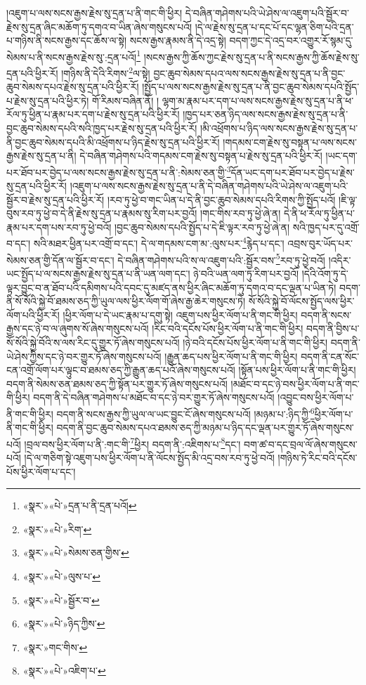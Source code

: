 །འཇུག་པ་ལས་སངས་རྒྱས་རྗེས་སུ་དྲན་པ་ནི་གང་གི་ཕྱིར། དེ་བཞིན་གཤེགས་པའི་ཡེ་ཤེས་ལ་འཇུག་པའི་སྦྱོར་བ་རྗེས་སུ་དྲན་ཞིང་མཆོག་ཏུ་དགའ་བ་ཡིན་ཞེས་གསུངས་པའོ། །དེ་ལ་རྗེས་སུ་དྲན་པ་དང་པོ་དང་ལྷན་ཅིག་པའི་དྲན་པ་གཉིས་ནི་སངས་རྒྱས་དང་ཆོས་ལ་སྟེ། སངས་རྒྱས་རྣམས་ནི་དེ་འདྲ་སྟེ། བདག་ཀྱང་དེ་འདྲ་བར་འགྱུར་རོ་སྙམ་དུ་སེམས་པ་ནི་སངས་རྒྱས་རྗེས་སུ་:དྲན་པའོ།\footnote{«སྣར་»«པེ་»དྲན་པ་ནི་དྲན་པའོ།} །སངས་རྒྱས་ཀྱི་ཆོས་ཀྱང་རྗེས་སུ་དྲན་པ་ནི་སངས་རྒྱས་ཀྱི་ཆོས་རྗེས་སུ་དྲན་པའི་ཕྱིར་རོ། །གཉིས་ནི་དེའི་རིགས་\footnote{«སྣར་»«པེ་»རིག་}ལ་སྟེ། བྱང་ཆུབ་སེམས་དཔའ་ལས་སངས་རྒྱས་རྗེས་སུ་དྲན་པ་ནི་བྱང་ཆུབ་སེམས་དཔའ་རྗེས་སུ་དྲན་པའི་ཕྱིར་རོ། །སྤྱོད་པ་ལས་སངས་རྒྱས་རྗེས་སུ་དྲན་པ་ནི་བྱང་ཆུབ་སེམས་དཔའི་སྤྱོད་པ་རྗེས་སུ་དྲན་པའི་ཕྱིར་ཏེ། གོ་རིམས་བཞིན་ནོ། །
ལྷག་མ་རྣམ་པར་དག་པ་ལས་སངས་རྒྱས་རྗེས་སུ་དྲན་པ་ནི་ཕ་རོལ་ཏུ་ཕྱིན་པ་རྣམ་པར་དག་པ་རྗེས་སུ་དྲན་པའི་ཕྱིར་རོ། །ཁྱད་པར་ཅན་ཉིད་ལས་སངས་རྒྱས་རྗེས་སུ་དྲན་པ་ནི་བྱང་ཆུབ་སེམས་དཔའི་སའི་ཁྱད་པར་རྗེས་སུ་དྲན་པའི་ཕྱིར་རོ། །མི་འཕྲོགས་པ་ཉིད་ལས་སངས་རྒྱས་རྗེས་སུ་དྲན་པ་ནི་བྱང་ཆུབ་སེམས་དཔའི་མི་འཕྲོགས་པ་ཉིད་རྗེས་སུ་དྲན་པའི་ཕྱིར་རོ། །གདམས་ངག་རྗེས་སུ་བསྟན་པ་ལས་སངས་རྒྱས་རྗེས་སུ་དྲན་པ་ནི། དེ་བཞིན་གཤེགས་པའི་གདམས་ངག་རྗེས་སུ་བསྟན་པ་རྗེས་སུ་དྲན་པའི་ཕྱིར་རོ། །ཡང་དག་པར་ཐོབ་པར་བྱེད་པ་ལས་སངས་རྒྱས་རྗེས་སུ་དྲན་པ་ནི་:སེམས་ཅན་གྱི་\footnote{«སྣར་»«པེ་»སེམས་ཅན་གྱིས་}དོན་ཡང་དག་པར་ཐོབ་པར་བྱེད་པ་རྗེས་སུ་དྲན་པའི་ཕྱིར་རོ། །འཇུག་པ་ལས་སངས་རྒྱས་རྗེས་སུ་དྲན་པ་ནི་དེ་བཞིན་གཤེགས་པའི་ཡེ་ཤེས་ལ་འཇུག་པའི་སྦྱོར་བ་རྗེས་སུ་དྲན་པའི་ཕྱིར་རོ། །རབ་ཏུ་ཕྱེ་བ་གང་ཡིན་པ་དེ་ནི་བྱང་ཆུབ་སེམས་དཔའི་རིགས་ཀྱི་སྤྱོད་པའོ། །ཇི་ལྟ་བུས་རབ་ཏུ་ཕྱེ་བ་དེ་ནི་རྗེས་སུ་དྲན་པ་རྣམས་སུ་རིག་པར་བྱའོ། །གང་གིས་རབ་ཏུ་ཕྱེ་ཞེ་ན། དེ་ནི་ཕ་རོལ་ཏུ་ཕྱིན་པ་རྣམ་པར་དག་པས་རབ་ཏུ་ཕྱེ་བའོ། །བྱང་ཆུབ་སེམས་དཔའི་སྤྱོད་པ་དེ་ཇི་ལྟར་རབ་ཏུ་ཕྱེ་ཞེ་ན། སའི་ཁྱད་པར་དུ་འགྲོ་བ་དང་། སའི་མཐར་ཕྱིན་པར་འགྲོ་བ་དང་། དེ་ལ་གདམས་ངག་མ་:ལུས་པར་\footnote{«སྣར་»«པེ་»ལུས་པ་}རྙེད་པ་དང་། འབྲས་བུར་ཡོད་པར་སེམས་ཅན་གྱི་དོན་ལ་སྦྱོར་བ་དང་། དེ་བཞིན་གཤེགས་པའི་ས་ལ་འཇུག་པའི་:སྦྱོར་བས་\footnote{«སྣར་»«པེ་»སྦྱོར་བ་}རབ་ཏུ་ཕྱེ་བའོ། །འདིར་ཡང་སྤྱོད་པ་ལ་སངས་རྒྱས་རྗེས་སུ་དྲན་པ་ནི་ཡན་ལག་དང་། ཉེ་བའི་ཡན་ལག་ཏུ་རིག་པར་བྱའོ། །དེའི་འོག་ཏུ་དེ་ལྟར་བྱུང་བ་ན་ཐོབ་པའི་དམིགས་པའི་དབང་དུ་མཛད་ནས་ཕྱིར་ཞིང་མཆོག་ཏུ་དགའ་བ་དང་ལྡན་པ་ཡིན་ཏེ། བདག་ནི་སོ་སོའི་སྐྱེ་བོ་ཐམས་ཅད་ཀྱི་ཡུལ་ལས་ཕྱིར་ལོག་གོ་ཞེས་རྒྱ་ཆེར་གསུངས་ཏེ། སོ་སོའི་སྐྱེ་བོ་ལོངས་སྤྱོད་ལས་ཕྱིར་ལོག་པའི་ཕྱིར་རོ། །ཕྱིར་ལོག་པ་དེ་ཡང་རྣམ་པ་དགུ་སྟེ། འཇུག་པས་ཕྱིར་ལོག་པ་ནི་གང་གི་ཕྱིར། བདག་ནི་སངས་རྒྱས་དང་ཉེ་བ་ལ་ཞུགས་སོ་ཞེས་གསུངས་པའོ། །རིང་བའི་དངོས་པོས་ཕྱིར་ལོག་པ་ནི་གང་གི་ཕྱིར། བདག་ནི་བྱིས་པ་སོ་སོའི་སྐྱེ་བོའི་ས་ལས་རིང་དུ་གྱུར་ཏོ་ཞེས་གསུངས་པའོ། །ཉེ་བའི་དངོས་པོས་ཕྱིར་ལོག་པ་ནི་གང་གི་ཕྱིར། བདག་ནི་ཡེ་ཤེས་ཀྱིས་དང་ཉེ་བར་གྱུར་ཏོ་ཞེས་གསུངས་པའོ། །རྒྱུན་ཆད་པས་ཕྱིར་ལོག་པ་ནི་གང་གི་ཕྱིར། བདག་ནི་ངན་སོང་ངན་འགྲོ་ལོག་པར་ལྟུང་བ་ཐམས་ཅད་ཀྱི་རྒྱུན་ཆད་པའོ་ཞེས་གསུངས་པའོ། །སྟོན་པས་ཕྱིར་ལོག་པ་ནི་གང་གི་ཕྱིར། བདག་ནི་སེམས་ཅན་ཐམས་ཅད་ཀྱི་སྟོན་པར་གྱུར་ཏོ་ཞེས་གསུངས་པའོ། །མཐོང་བ་དང་ཉེ་བས་ཕྱིར་ལོག་པ་ནི་གང་གི་ཕྱིར། བདག་ནི་དེ་བཞིན་གཤེགས་པ་མཐོང་བ་དང་ཉེ་བར་གྱུར་ཏོ་ཞེས་གསུངས་པའོ། །འབྱུང་བས་ཕྱིར་ལོག་པ་ནི་གང་གི་ཕྱིར། བདག་ནི་སངས་རྒྱས་ཀྱི་ཡུལ་ལ་ཡང་བྱུང་ངོ་ཞེས་གསུངས་པའོ། །མཉམ་པ་:ཉིད་ཀྱི་\footnote{«སྣར་»«པེ་»ཉིད་ཀྱིས་}ཕྱིར་ལོག་པ་ནི་གང་གི་ཕྱིར། བདག་ནི་བྱང་ཆུབ་སེམས་དཔའ་ཐམས་ཅད་ཀྱི་མཉམ་པ་ཉིད་དང་ལྡན་པར་གྱུར་ཏོ་ཞེས་གསུངས་པའོ། །བྲལ་བས་ཕྱིར་ལོག་པ་ནི་:གང་གི་\footnote{«སྣར་»གང་གིས་}ཕྱིར། བདག་ནི་:འཇིགས་པ་\footnote{«སྣར་»«པེ་»འཇིག་པ་}དང་། བག་ཚ་བ་དང་བྲལ་ལོ་ཞེས་གསུངས་པའོ། །དེ་ལ་གཅིག་སྟེ་འཇུག་པས་ཕྱིར་ལོག་པ་ནི་ལོངས་སྤྱོད་མི་འདྲ་བས་རབ་ཏུ་ཕྱེ་བའོ། །གཉིས་ཏེ་རིང་བའི་དངོས་པོས་ཕྱིར་ལོག་པ་དང་། 